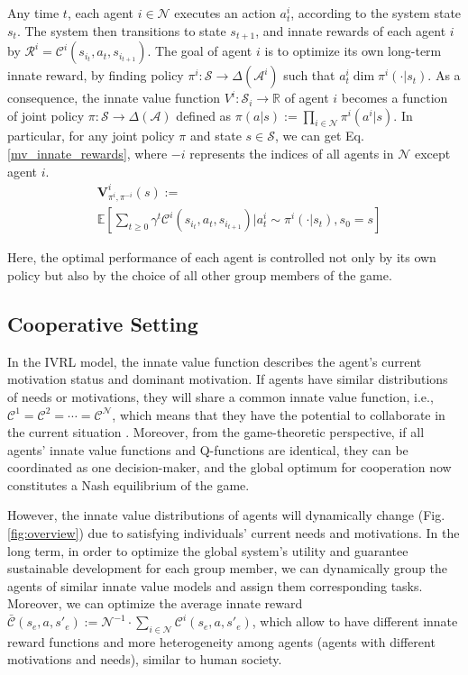 \documentclass[letterpaper]{article} %
\begin{document}
Any time $t$, each agent $i \in \mathcal{N}$ executes an action $a_t^i$, according to the system state $s_t$. The system then transitions to state $s_{t+1}$, and innate rewards of each agent $i$ by $\mathcal{R}^i = \mathcal{C}^i(s_{i_t}, a_t, s_{i_{t+1}})$. The goal of agent $i$ is to optimize its own long-term innate reward, by finding policy $\pi^i: \mathcal{S} \rightarrow \Delta(\mathcal{A}^i)$ such that $a_t^i \dim \pi^i(\cdot \vert s_t)$. As a consequence, the innate value function $V^i: \mathcal{S}_i \rightarrow \mathbb{R}$ of agent $i$ becomes a function of joint policy $\pi: \mathcal{S} \rightarrow \Delta(\mathcal{A})$ defined as $\pi(a \vert s):= \prod_{i \in \mathcal{N}} \pi^i(a^i \vert s)$. In particular, for any joint policy $\pi$ and state $s \in \mathcal{S}$, we can get Eq. \eqref{mv_innate_rewards}, where $-i$ represents the indices of all agents in $\mathcal{N}$ except agent $i$.
\begin{equation}
\begin{split}
    & \mathbf{V}_{\pi^i, \pi^{-i}}^i (s) := \\
    & \mathbb{E} \left[\sum_{t \geq 0} \gamma^t \mathcal{C}^i(s_{i_t}, a_t, s_{i_{t+1}}) \bigg\vert a_t^i \sim \pi^i(\cdot \vert s_t), s_0 = s \right]
\label{mv_innate_rewards}
\end{split}
\end{equation}

Here, the optimal performance of each agent is controlled not only by its own policy but also by the choice of all other group members of the game.

\subsection{Cooperative Setting}

In the IVRL model, the innate value function describes the agent's current motivation status and dominant motivation. If agents have similar distributions of needs or motivations, they will share a common innate value function, i.e., $\mathcal{C}^1 = \mathcal{C}^2 = \cdots = \mathcal{C}^\mathcal{N}$, which means that they have the potential to collaborate in the current situation \cite{yang2021can}. Moreover, from the game-theoretic perspective, if all agents' innate value functions and Q-functions are identical, they can be coordinated as one decision-maker, and the global optimum for cooperation now constitutes a Nash equilibrium of the game.

However, the innate value distributions of agents will dynamically change (Fig. \ref{fig:overview}) due to satisfying individuals' current needs and motivations. In the long term, in order to optimize the global system’s utility and guarantee sustainable development for each group member, we can dynamically group the agents of similar innate value models and assign them corresponding tasks. Moreover, we can optimize the average innate reward $\bar{\mathcal{C}}(s_e, a, s'_e) := \mathcal{N}^{-1} \cdot \sum_{i \in \mathcal{N}} \mathcal{C}^i(s_e, a, s'_e)$, which allow to have different innate reward functions and more heterogeneity among agents (agents with different motivations and needs), similar to human society.
\end{document}

